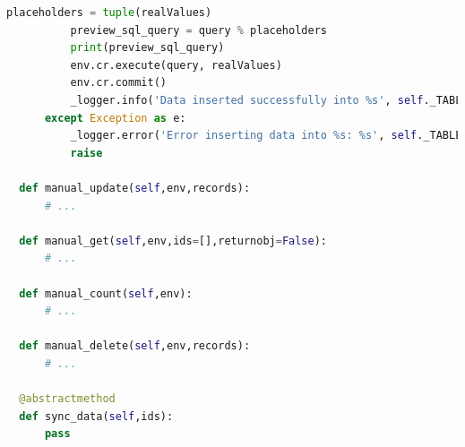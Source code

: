 \begin{lstlisting}[style=mystyle, language=Python, caption={Penerapan Class Abstract}]
          placeholders = tuple(realValues)
          preview_sql_query = query % placeholders
          print(preview_sql_query)
          env.cr.execute(query, realValues)
          env.cr.commit()
          _logger.info('Data inserted successfully into %s', self._TABLE_NAME)
      except Exception as e:
          _logger.error('Error inserting data into %s: %s', self._TABLE_NAME, str(e))
          raise
  
  def manual_update(self,env,records):
      # ...
  
  def manual_get(self,env,ids=[],returnobj=False):
      # ...
  
  def manual_count(self,env):
      # ...
    
  def manual_delete(self,env,records):
      # ...
  
  @abstractmethod
  def sync_data(self,ids):
      pass
\end{lstlisting} 

\pagebreak 

